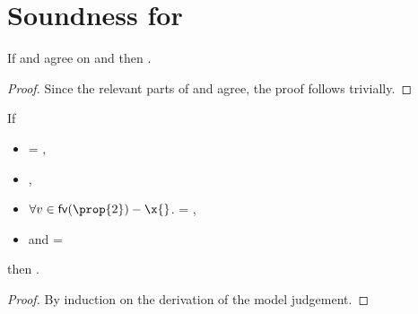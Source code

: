 \chapter{Soundness for \lambdatc{}}

{}

\begin{lemma} \label{appendix:lemma:envagree}
  If \openv{} and \openvp{} agree on \fv{\prop{}}
  and \satisfies{\openv{}}{\prop{}}
  then \satisfies{\openvp{}}{\prop{}}.
\begin{proof}
  Since the relevant parts of \openv{} and \openvp{} agree, the proof follows trivially.
\end{proof}
\end{lemma}

\begin{lemma} \label{appendix:lemma:substfilter}
  If 
  \begin{itemize}
    \item {} = { {\object{}} {\x{}}},
    \item
  {},
    \item
  $\forall v \in \fv{\prop{2}} - \x{}$.
                              {} = {},
    \item
  and {} = {}
  \end{itemize}
  then .

  \begin{proof}
    By induction on the derivation of the model judgement.
  \end{proof}
\end{lemma}

